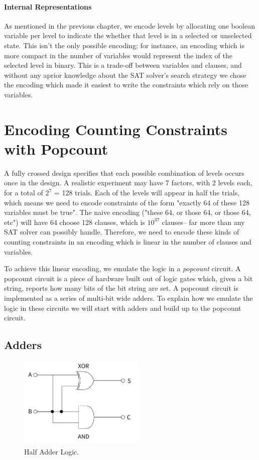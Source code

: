 \paragraph*{Internal Representations}

As mentioned in the previous chapter, we encode levels by allocating one boolean variable per level to indicate the whether that level is in a selected or unselected state. This isn't the only possible encoding; for instance, an encoding which is more compact in the number of variables would represent the index of the selected level in binary. This is a trade-off between variables and clauses, and without any aprior knowledge about the SAT solver's search strategy we chose the encoding which made it easiest to write the constraints which rely on those variables.


\section{Encoding Counting Constraints with Popcount}

A fully crossed design specifies that each possible combination of levels occurs once in the design. A realistic experiment may have 7 factors, with 2 levels each, for a total of $2^7$ = 128 trials. Each of the levels will appear in half the trials, which means we need to encode constraints of the form "exactly 64 of these 128 variables must be true". The naive encoding ("these 64, or those 64, or those 64, etc") will have 64 choose 128 clauses, which is $10^{37}$ clauses-- far more than any SAT solver can possibly handle. Therefore, we need to encode these kinds of counting constraints in an encoding which is linear in the number of clauses and variables.

To achieve this linear encoding, we emulate the logic in a \emph{popcount} circuit. A popcount circuit is a piece of hardware built out of logic gates which, given a bit string, reports how many bits of the bit string are set. A popcount circuit is implemented as a series of multi-bit wide adders. To explain how we emulate the logic in these circuits we will start with adders and build up to the popcount circuit.

\subsection{Adders}

\begin{figure}[t]
    \centerline{\includegraphics[origin=c,width=6cm]{fig_half_adder}}
    \caption{Half Adder Logic.}%
    \label{fig:half_adder}%
\end{figure}

